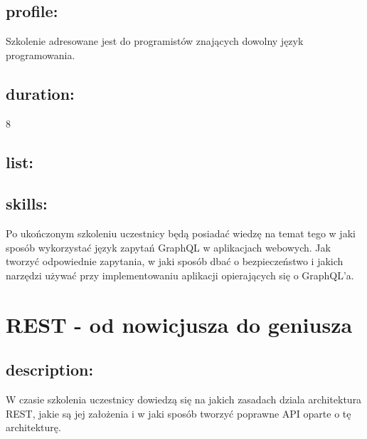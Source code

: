 \documentclass{article}[10pt]
\begin{document}
	\subsection*{profile:}
\begin{adjustwidth}{2cm}{}
	
Szkolenie adresowane jest do programistów znających dowolny język programowania.
\end{adjustwidth}
	\subsection*{duration:}
\begin{adjustwidth}{2cm}{}
	8
\end{adjustwidth}

	\subsection*{list:}
\begin{adjustwidth}{1.5cm}{}
	\begin{itemize}










	\end{itemize}
\end{adjustwidth}

	\subsection*{skills:}
\begin{adjustwidth}{2cm}{}
	
Po ukończonym szkoleniu uczestnicy będą posiadać wiedzę na temat tego w jaki sposób wykorzystać język zapytań GraphQL w aplikacjach webowych. Jak tworzyć odpowiednie zapytania, w jaki sposób dbać o bezpieczeństwo i jakich narzędzi używać przy implementowaniu aplikacji opierających się o GraphQL’a.



\end{adjustwidth}

\newpage


    
	\section{REST - od nowicjusza do geniusza}

	\subsection*{description:}
	\begin{adjustwidth}{2cm}{}
		W czasie szkolenia uczestnicy dowiedzą się na jakich zasadach dziala architektura REST, jakie są jej założenia i w jaki sposób tworzyć poprawne API oparte o tę architekturę.
	\end{adjustwidth}
\end{document}
